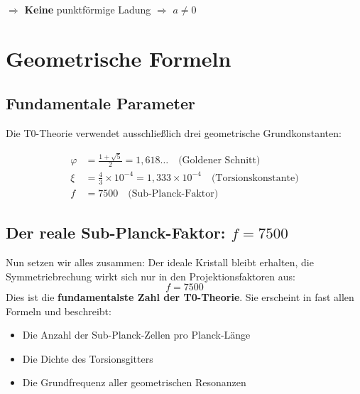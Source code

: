 	$\Rightarrow$ \textbf{Keine} punktförmige Ladung $\Rightarrow$ $a \neq 0$
	
	\section{Geometrische Formeln}
	
	\subsection{Fundamentale Parameter}
	
	Die T0-Theorie verwendet ausschließlich drei geometrische Grundkonstanten:
	
	\begin{align}
		\varphi &= \frac{1 + \sqrt{5}}{2} = 1{,}618\ldots \quad \text{(Goldener Schnitt)} \\
		\xi &= \frac{4}{3} \times 10^{-4} = 1{,}333 \times 10^{-4} \quad \text{(Torsionskonstante)} \\
		f &= 7500 \quad \text{(Sub-Planck-Faktor)}
	\end{align}
	\subsection{Der reale Sub-Planck-Faktor: \(f = 7500\)}
	Nun setzen wir alles zusammen: Der ideale Kristall bleibt erhalten, die Symmetriebrechung wirkt sich nur in den Projektionsfaktoren aus:
	\begin{equation}
		\boxed{f = 7500}
	\end{equation}
	Dies ist die \textbf{fundamentalste Zahl der T0-Theorie}. Sie erscheint in fast allen Formeln und beschreibt:
	\begin{itemize}
		\item Die Anzahl der Sub-Planck-Zellen pro Planck-Länge
		\item Die Dichte des Torsionsgitters
		\item Die Grundfrequenz aller geometrischen Resonanzen
	\end{itemize}
